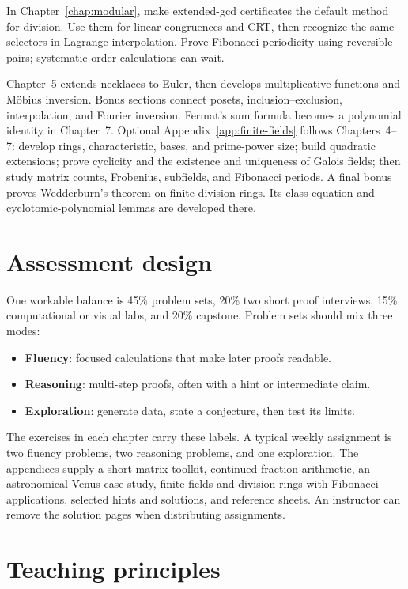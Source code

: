 In Chapter~\ref{chap:modular}, make extended-gcd certificates the default
method for division. Use them for linear congruences and CRT, then
recognize the same selectors in Lagrange interpolation. Prove Fibonacci
periodicity using reversible pairs; systematic order calculations can wait.

Chapter~5 extends necklaces to Euler, then develops multiplicative
functions and M\"obius inversion. Bonus sections connect posets,
inclusion--exclusion, interpolation, and Fourier inversion.
Fermat's sum formula becomes a polynomial identity in Chapter~7.
Optional Appendix~\ref{app:finite-fields} follows Chapters~4--7:
develop rings, characteristic, bases, and prime-power size; build quadratic
extensions; prove cyclicity and the existence and uniqueness of Galois
fields; then study matrix counts, Frobenius, subfields, and Fibonacci
periods. A final bonus proves Wedderburn's theorem on finite division rings.
Its class equation and cyclotomic-polynomial lemmas are developed there.

\section*{Assessment design}

One workable balance is 45\% problem sets, 20\% two short proof interviews, 15\% computational or visual labs, and 20\% capstone. Problem sets should mix three modes:
\begin{itemize}
  \item \textbf{Fluency}: focused calculations that make later proofs readable.
  \item \textbf{Reasoning}: multi-step proofs, often with a hint or intermediate claim.
  \item \textbf{Exploration}: generate data, state a conjecture, then test its limits.
\end{itemize}

The exercises in each chapter carry these labels. A typical weekly assignment is two fluency problems, two reasoning problems, and one exploration. The appendices supply a short matrix toolkit, continued-fraction arithmetic, an astronomical Venus case study, finite fields and division rings with Fibonacci applications, selected hints and solutions, and reference sheets. An instructor can remove the solution pages when distributing assignments.

\section*{Teaching principles}

